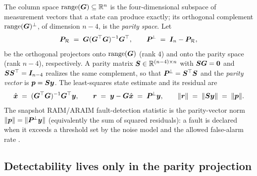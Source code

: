 The column space $\operatorname{range}(\bm{G})\subseteq\mathbb{R}^{n}$ is the four-dimensional subspace of
measurement vectors that a state can produce exactly; its orthogonal complement
$\operatorname{range}(\bm{G})^{\perp}$, of dimension $n-4$, is the \emph{parity space}. Let
\begin{equation}
  \bm{P}_{\mathcal{R}} \;=\; \bm{G}(\bm{G}^\top\bm{G})^{-1}\bm{G}^\top,
  \qquad
  \bm{P}^{\!\perp} \;=\; \bm I_n - \bm{P}_{\mathcal{R}},
  \label{eq:projectors}
\end{equation}
be the orthogonal projectors onto $\operatorname{range}(\bm{G})$ (rank $4$) and onto the parity space
(rank $n-4$), respectively. A parity matrix $\bm{S}\in\mathbb{R}^{(n-4)\times n}$ with
$\bm{S}\bm{G}=\bm 0$ and $\bm{S}\bm{S}^\top=\bm I_{n-4}$ realizes the same complement, so
that $\bm{P}^{\!\perp}=\bm{S}^\top\bm{S}$ and the \emph{parity vector} is $\bm p=\bm{S}\bm{y}$. The
least-squares state estimate and its residual are
\begin{equation}
  \hat{\bm{x}} \;=\; (\bm{G}^\top\bm{G})^{-1}\bm{G}^\top\bm{y},
  \qquad
  \bm r \;=\; \bm{y} - \bm{G}\hat{\bm{x}} \;=\; \bm{P}^{\!\perp}\bm{y},
  \qquad
  \|\bm r\| \;=\; \|\bm{S}\bm{y}\| \;=\; \|\bm p\|.
  \label{eq:residual}
\end{equation}
The snapshot RAIM/ARAIM fault-detection statistic is the parity-vector norm
$\|\bm p\|=\|\bm{P}^{\!\perp}\bm{y}\|$ (equivalently the sum of squared residuals): a fault is
declared when it exceeds a threshold set by the noise model and the allowed false-alarm
rate \citep{sturza1988,brown1992,parkinson1988}.

\subsection{Detectability lives only in the parity projection}
\label{sec:detectability}

